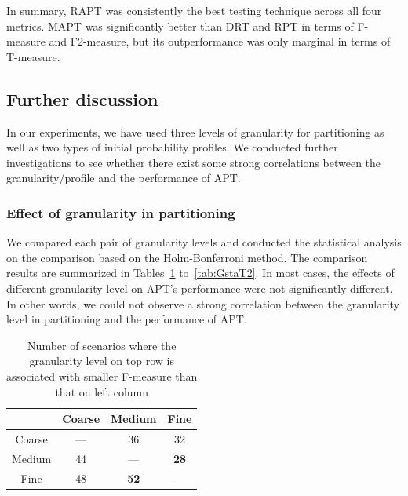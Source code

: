 \documentclass[10pt,journal,compsoc]{IEEEtran}
\begin{document}
In summary, RAPT was consistently the best testing technique across all four metrics. MAPT was significantly better than DRT and RPT in terms of F-measure and F2-measure, but its outperformance was only marginal in terms of T-measure.

\subsection{Further discussion}

In our experiments, we have used three levels of granularity for partitioning as well as two types of initial probability profiles. We conducted further investigations to see whether there exist some strong correlations between the granularity/profile and the performance of APT.

\subsubsection{Effect of granularity in partitioning}

We compared each pair of granularity levels and conducted the statistical analysis on the comparison based on the Holm-Bonferroni method. The comparison results are summarized in Tables~\ref{tab:GstaF} to~\ref{tab:GstaT2}. In most cases, the effects of different granularity level on APT's performance were not significantly different. In other words, we could not observe a strong correlation between the granularity level in partitioning and the performance of APT.


\begin{table}
\caption{Number of scenarios where the granularity level on top row is associated with smaller F-measure than that on left column}
\label{tab:GstaF}
\centering
\begin{tabular}{|c|c|c|c|} \hline
				& Coarse			& Medium			& Fine				\\ \hline
Coarse	& ---					& 36					& 32					\\ \hline
Medium	& 44					& ---					& \textbf{28}	\\ \hline
Fine		& 48					& \textbf{52}	& ---					\\ \hline
\end{tabular}
\end{table}
\end{document}
